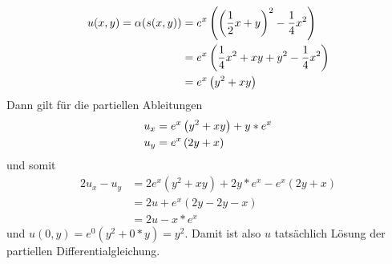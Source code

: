 \begin{exercisePage}[Charakteristikenmethode]
\begin{enumerate}[label=(zu \alph*), leftmargin=*]
\begin{equation*}
			\begin{aligned}
				u(x,y) = \alpha(s(x,y)) 
				&= e^{x} \left( \left( \frac{1}{2} x + y \right)^2 - \frac{1}{4} x^2 \right) \\
				&= e^x \left( \frac{1}{4} x^2 + xy + y^2 - \frac{1}{4} x^2  \right) \\
				&= e^x \left( y^2 + xy \right) 
			\end{aligned}
		\end{equation*}
		Dann gilt für die partiellen Ableitungen
		\begin{equation*}
			\begin{aligned}
				u_x &= e^x \left( y^2 + xy \right) + y*e^x \\
				u_y &= e^x \left( 2y + x \right) 
			\end{aligned}
		\end{equation*}
		und somit
		\begin{equation*}
			\begin{aligned}
				2u_x - u_y &= 2e^x (y^2 + xy) + 2y * e^x - e^x (2y + x) \\
				&= 2u + e^x (2y - 2y - x) \\
				&= 2u - x*e^x 
			\end{aligned}
		\end{equation*}
		und $u(0,y) = e^0 (y^2 + 0*y) = y^2$. Damit ist also $u$ tatsächlich Lösung der partiellen Differentialgleichung.
	\end{enumerate}
\end{exercisePage}